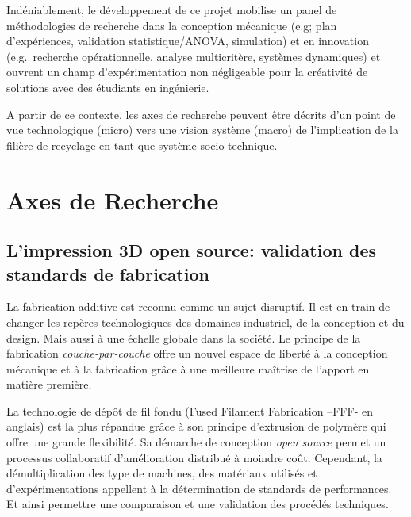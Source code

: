 \documentclass[
  12pt,
  oneside]{book}
\begin{document}
Indéniablement, le développement de ce projet mobilise un panel de méthodologies de recherche dans la conception mécanique (e.g; plan d'expériences, validation statistique/ANOVA, simulation) et en innovation (e.g.~recherche opérationnelle, analyse multicritère, systèmes dynamiques) et ouvrent un champ d'expérimentation non négligeable pour la créativité de solutions avec des étudiants en ingénierie.

A partir de ce contexte, les axes de recherche peuvent être décrits d'un point de vue technologique (micro) vers une vision système (macro) de l'implication de la filière de recyclage en tant que système socio-technique.

\hypertarget{axes-de-recherche}{%
\section{Axes de Recherche}\label{axes-de-recherche}}

\hypertarget{limpression-3d-open-source-validation-des-standards-de-fabrication}{%
\subsection{L'impression 3D open source: validation des standards de fabrication}\label{limpression-3d-open-source-validation-des-standards-de-fabrication}}

La fabrication additive est reconnu comme un sujet disruptif.
Il est en train de changer les repères technologiques des domaines industriel, de la conception et du design.
Mais aussi à une échelle globale dans la société.
Le principe de la fabrication \emph{couche-par-couche} offre un nouvel espace de liberté à la conception mécanique et à la fabrication grâce à une meilleure maîtrise de l'apport en matière première.

La technologie de dépôt de fil fondu (Fused Filament Fabrication --FFF- en anglais) est la plus répandue grâce à son principe d'extrusion de polymère qui offre une grande flexibilité. Sa démarche de conception \emph{open source} permet un processus collaboratif d'amélioration distribué à moindre coût.
Cependant, la démultiplication des type de machines, des matériaux utilisés et d'expérimentations appellent à la détermination de standards de performances. Et ainsi permettre une comparaison et une validation des procédés techniques.
\end{document}
